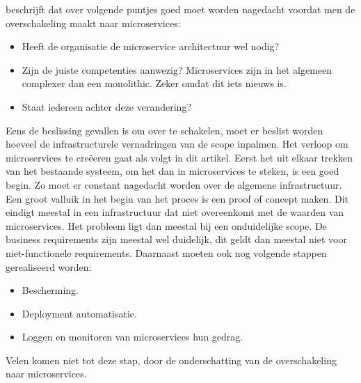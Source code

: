 \textcite{Benetis2016a} beschrijft dat over volgende puntjes goed moet worden nagedacht voordat men de overschakeling maakt naar microservices:
\begin{itemize}
	\item Heeft de organisatie de microservice architectuur wel nodig?
	\item Zijn de juiste competenties aanwezig? Microservices zijn in het algemeen complexer dan een monolithic. Zeker omdat dit iets nieuws is. 
	\item  Staat iedereen achter deze verandering?
\end{itemize}
Eens de beslissing gevallen is om over te schakelen, moet er beslist worden hoeveel de infrastructurele vernadringen van de scope inpalmen. Het verloop om microservices te creëeren gaat als volgt in dit artikel. Eerst het uit elkaar trekken van het bestaande systeem, om het dan in microservices te steken, is een goed begin. Zo moet er constant nagedacht worden over de algemene infrastructuur. Een groot valluik in het begin van het proces is een proof of concept maken. Dit eindigt meestal in een infrastructuur dat niet overeenkomt met de waarden van microservices. Het probleem ligt dan meestal bij een onduidelijke scope. De business requirements zijn meestal wel duidelijk, dit geldt dan meestal niet voor niet-functionele requirements. Daarnaast moeten ook nog volgende stappen gerealiseerd worden:
\begin{itemize}
	\item Bescherming.
	\item Deployment automatisatie.
	\item Loggen en monitoren van microservices hun gedrag.
\end{itemize}
Velen komen niet tot deze stap, door de onderschatting van de overschakeling naar microservices.


